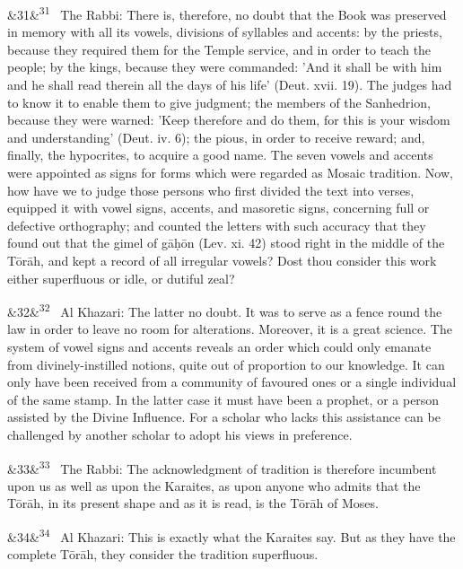\documentclass[12pt]{article}
\newcommand{\para}[1][]{\par\noindent\ifx&#1&\else\textsuperscript{\footnotesize #1}~\fi}
\begin{document}
\para[31] The Rabbi: There is, therefore, no doubt that the Book was preserved in memory with all its vowels, divisions of syllables and accents: by the priests, because they required them for the Temple service, and in order to teach the people; by the kings, because they were commanded: 'And it shall be with him and he shall read therein all the days of his life' (Deut. xvii. 19). The judges had to know it to enable them to give judgment; the members of the Sanhedrion, because they were warned: 'Keep therefore and do them, for this is your wisdom and understanding' (Deut. iv. 6); the pious, in order to receive reward; and, finally, the hypocrites, to acquire a good name. The seven vowels and accents were appointed as signs for forms which were regarded as Mosaic tradition. Now, how have we to judge those persons who first divided the text into verses, equipped it with vowel signs, accents, and masoretic signs, concerning full or defective orthography; and counted the letters with such accuracy that they found out that the gimel of gāḥōn (Lev. xi. 42) stood right in the middle of the Tōrāh, and kept a record of all irregular vowels? Dost thou consider this work either superfluous or idle, or dutiful zeal?

\para[32] Al Khazari: The latter no doubt. It was to serve as a fence round the law in order to leave no room for alterations. Moreover, it is a great science. The system of vowel signs and accents reveals an order which could only emanate from divinely-instilled notions, quite out of proportion to our knowledge. It can only have been received from a community of favoured ones or a single individual of the same stamp. In the latter case it must have been a prophet, or a person assisted by the Divine Influence. For a scholar who lacks this assistance can be challenged by another scholar to adopt his views in preference.

\para[33] The Rabbi: The acknowledgment of tradition is therefore incumbent upon us as well as upon the Karaites, as upon anyone who admits that the Tōrāh, in its present shape and as it is read, is the Tōrāh of Moses.

\para[34] Al Khazari: This is exactly what the Karaites say. But as they have the complete Tōrāh, they consider the tradition superfluous.
\end{document}
